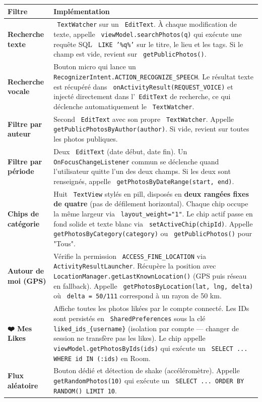 \documentclass[a4paper,12pt,openany]{report}
\newcommand{\ic}[1]{\texttt{\small\colorbox{lightbg}{\color{navy!90} #1}}}
\begin{document}
\begin{tabularx}{\textwidth}{>{\bfseries}l X}
  \toprule
  Filtre & Implémentation \\
  \midrule
  Recherche texte
    & \ic{TextWatcher} sur un \ic{EditText}. À chaque modification de texte,
      appelle \ic{viewModel.searchPhotos(q)} qui exécute une requête SQL
      \ic{LIKE '\%q\%'} sur le titre, le lieu et les tags.
      Si le champ est vide, revient sur \ic{getPublicPhotos()}. \\
  Recherche vocale
    & Bouton micro qui lance un \ic{RecognizerIntent.ACTION\_RECOGNIZE\_SPEECH}.
      Le résultat texte est récupéré dans \ic{onActivityResult(REQUEST\_VOICE)}
      et injecté directement dans l'\ic{EditText} de recherche, ce qui
      déclenche automatiquement le \ic{TextWatcher}. \\
  Filtre par auteur
    & Second \ic{EditText} avec son propre \ic{TextWatcher}. Appelle
      \ic{getPublicPhotosByAuthor(author)}. Si vide, revient sur toutes
      les photos publiques. \\
  Filtre par période
    & Deux \ic{EditText} (date début, date fin). Un \ic{OnFocusChangeListener}
      commun se déclenche quand l'utilisateur quitte l'un des deux champs.
      Si les deux sont renseignés, appelle \ic{getPhotosByDateRange(start, end)}. \\
  Chips de catégorie
    & Huit \ic{TextView} stylés en pill, disposés en \textbf{deux rangées fixes
      de quatre} (pas de défilement horizontal). Chaque chip occupe la même
      largeur via \ic{layout\_weight="1"}. Le chip actif passe en fond solide
      et texte blanc via \ic{setActiveChip(chipId)}.
      Appelle \ic{getPhotosByCategory(category)} ou \ic{getPublicPhotos()} pour "Tous". \\
  Autour de moi (GPS)
    & Vérifie la permission \ic{ACCESS\_FINE\_LOCATION} via
      \ic{ActivityResultLauncher}. Récupère la position avec
      \ic{LocationManager.getLastKnownLocation()} (GPS puis réseau en fallback).
      Appelle \ic{getPhotosByLocation(lat, lng, delta)} où \ic{delta = 50/111}
      correspond à un rayon de 50 km. \\
  ❤️ Mes Likes
    & Affiche toutes les photos likées par le compte connecté. Les IDs sont
      persistés en \ic{SharedPreferences} sous la clé \ic{liked\_ids\_\{username\}}
      (isolation par compte — changer de session ne transfère pas les likes).
      Le chip appelle \ic{viewModel.getPhotosByIds(ids)} qui exécute un
      \ic{SELECT ... WHERE id IN (:ids)} en Room. \\
  Flux aléatoire
    & Bouton dédié et détection de shake (accéléromètre). Appelle
      \ic{getRandomPhotos(10)} qui exécute un \ic{SELECT ... ORDER BY RANDOM() LIMIT 10}. \\
  \bottomrule
\end{tabularx}
\end{document}
